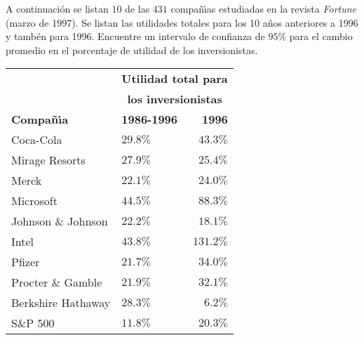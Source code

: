 \begin{enunciado}
 A continuaci\'on se listan $10$ de las $431$ compa\~n\'{\i}as estudiadas en la revista \textit{Fortune} (marzo de 1997). Se listan las utilidades totales para los 10 a\~nos anteriores a 1996 y tamb\'en para 1996. Encuentre un intervalo de confianza de $95\%$ para el cambio promedio en el porcentaje de utilidad de los inversionistas.
 \begin{center}
  \begin{tabular}{llr}
   & \multicolumn{2}{c}{\textbf{Utilidad total para}} \\
   & \multicolumn{2}{c}{\textbf{los inversionistas}} \\
   \textbf{Compa\~n\'{\i}a} & \textbf{1986-1996} & \textbf{1996} \\
   \hline 
   Coca-Cola & $29.8\%$ & $43.3\%$ \\
   Mirage Resorts & $27.9\%$ & $25.4\%$ \\
   Merck & $22.1\%$ & $24.0\%$ \\
   Microsoft & $44.5\%$ & $88.3\%$ \\
   Johnson \& Johnson & $22.2\%$ & $18.1\%$ \\
   Intel & $43.8\%$ & $131.2\%$ \\
   Pfizer & $21.7\%$ & $34.0\%$ \\
   Procter \& Gamble & $21.9\%$ & $32.1\%$ \\
   Berkshire Hathaway & $28.3\%$ & $6.2\%$ \\
   S\&P 500 & $11.8\%$ & $20.3\%$
  \end{tabular}
 \end{center}
\end{enunciado}


